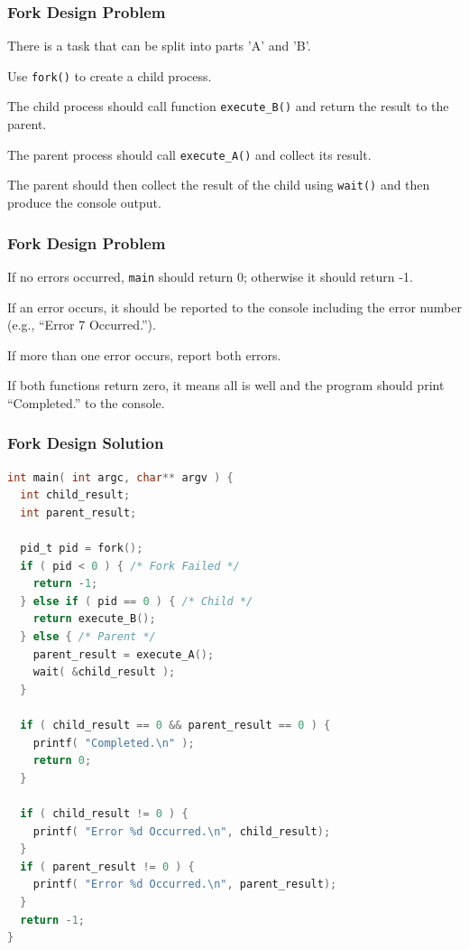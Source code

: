 \begin{frame}
\frametitle{Fork Design Problem}

There is a task that can be split into parts 'A' and 'B'. 

Use \texttt{fork()} to create a child process. 

The child process should call function \texttt{execute\_B()} and return the result to the parent. 

The parent process should call \texttt{execute\_A()} and collect its result.

The parent should then collect the result of the child using \texttt{wait()} and then produce the console output.

\end{frame}

\begin{frame}
\frametitle{Fork Design Problem}
If no errors occurred, \texttt{main} should return 0; otherwise it should return -1.

If an error occurs, it should be reported to the console including the error number (e.g., ``Error 7 Occurred.''). 

If more than one error occurs, report both errors. 

If both functions return zero, it means all is well and the program should print ``Completed.'' to the console.

\end{frame}


\begin{frame}[fragile]
\frametitle{Fork Design Solution}
\begin{lstlisting}[language=C]
int main( int argc, char** argv ) {
  int child_result;
  int parent_result;

  pid_t pid = fork();
  if ( pid < 0 ) { /* Fork Failed */
    return -1;
  } else if ( pid == 0 ) { /* Child */
    return execute_B();
  } else { /* Parent */ 
    parent_result = execute_A();
    wait( &child_result );
  }
  
  if ( child_result == 0 && parent_result == 0 ) {
    printf( "Completed.\n" );
    return 0;
  }
  
  if ( child_result != 0 ) {
    printf( "Error %d Occurred.\n", child_result);
  }
  if ( parent_result != 0 ) {
    printf( "Error %d Occurred.\n", parent_result);
  }
  return -1;
}
\end{lstlisting}
\end{frame}

